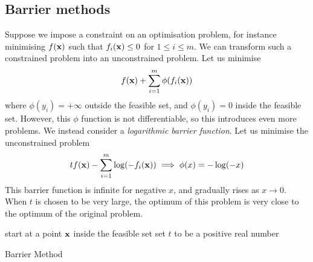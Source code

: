 \subsection{Barrier methods}
Suppose we impose a constraint on an optimisation problem, for instance minimising \(f(\vb x)\) such that \(f_i(\vb x) \leq 0\) for \(1 \leq i \leq m\).
We can transform such a constrained problem into an unconstrained problem.
Let us minimise
\[
	f(\vb x) + \sum_{i=1}^m \phi(f_i(\vb x))
\]
where \(\phi(y_i) = +\infty\) outside the feasible set, and \(\phi(y_i) = 0\) inside the feasible set.
However, this \(\phi\) function is not differentiable, so this introduces even more problems.
We instead consider a \textit{logarithmic barrier function}.
Let us minimise the unconstrained problem
\[
	tf(\vb x) - \sum_{i=1}^m \log(-f_i(\vb x)) \implies \phi(x) = -\log (-x)
\]
This barrier function is infinite for negative \(x\), and gradually rises as \(x \to 0\).
When \(t\) is chosen to be very large, the optimum of this problem is very close to the optimum of the original problem.

\begin{algorithm*}[H]
	\SetAlgoLined{}
	start at a point \(\vb x\) inside the feasible set\;
	set \(t\) to be a positive real number\;
	\caption{Barrier Method}
\end{algorithm*}
